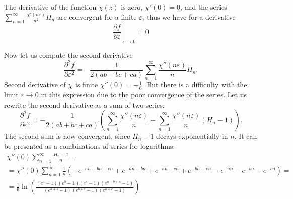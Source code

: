 \documentclass{article}
\begin{document}
The derivative of the function $\chi(z)$ is zero, $\chi'(0)=0$, and the series
$\sum_{n=1}^{\infty} \frac{\chi'(n\varepsilon)}{n^{2}}H_{n}$ are convergent for a finite
$\varepsilon$, thus we have for a derivative
\begin{equation}
  \label{eq:43}
\left.\frac{\partial f}{\partial \varepsilon}\right|_{\varepsilon\to 0}=0
\end{equation}

Now let us compute the second derivative
\begin{equation}
  \label{eq:44}
\frac{\partial^{2} f}{\partial
  \varepsilon^{2}}=-\frac{1}{2(ab+bc+ca)} \sum _{n=1}^{\infty} \frac{\chi''(n\varepsilon)}{n} H_{n}.  
\end{equation}
Second derivative of $\chi$ is finite $\chi''(0)=-\frac{1}{6}$. But there is a difficulty with the
limit $\varepsilon\to 0$ in this expression due to the poor convergence of the series. Let us
rewrite the second derivative as a sum of two series:
\begin{equation}
  \label{eq:46}
\frac{\partial^{2} f}{\partial
  \varepsilon^{2}}=-\frac{1}{2(ab+bc+ca)} \left(\sum _{n=1}^{\infty} \frac{\chi''(n\varepsilon)}{n}+
  \sum_{n=1}^{\infty} \frac{\chi''(n\varepsilon)}{n}(H_{n}-1)\right).    
\end{equation}
The second sum is now convergent, since $H_{n}-1$ decays exponentially in $n$. It can be presented
as a combinations of series for logarithms:
\begin{multline}
  \label{eq:47}
  \chi''(0)\sum_{n=1}^{\infty} \frac{H_{n}-1}{n}=\\=\chi''(0)\sum_{n=1}^{\infty}\frac{1}{n}\left(-e^{-a
      n-b n-c n}+e^{-a n-b n}+e^{-a n-c n}+e^{-b n-c n} - e^{-a n}-e^{-b n}-e^{-c n}\right)=\\
  =\frac{1}{6}\ln\left(\frac{(e^{a}-1)(e^{b}-1)(e^{c}-1)(e^{a+b+c}-1)}{(e^{a+b}-1)(e^{b+c}-1)(e^{a+c}-1)}\right)
\end{multline}
\end{document}
